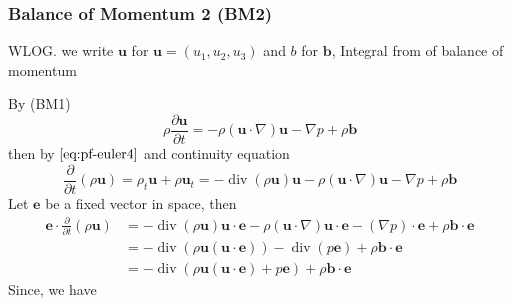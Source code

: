 \subsubsection{Balance of Momentum 2 (BM2)} %

WLOG. we write $\textbf{u}$ for $\textbf{u} = (u_1, u_2, u_3)$ and $b$ for $\textbf{b}$, Integral from of balance of momentum

By (BM1) 
\begin{equation}
\rho \frac{\partial \textbf{u}}{\partial t} = - \rho (\textbf{u}\cdot \nabla) \textbf{u} - \nabla p + \rho \textbf{b}\label{eq:pf-euler4}
\end{equation}
then by $\ref{eq:pf-euler4}$  and continuity equation
\begin{equation}
\frac{\partial}{\partial t} (\rho \textbf{u}) = \rho_{t} \textbf{u} + \rho \textbf{u}_t = -\operatorname{div}(\rho\textbf{u}) \textbf{u} - \rho (\textbf{u}\cdot \nabla )\textbf{u} - \nabla p + \rho \textbf{b}
\end{equation}
Let $\textbf{e}$ be a fixed vector in space, then
\begin{equation}
\begin{aligned}
\textbf{e} \cdot \frac{\partial }{\partial t} (\rho \textbf{u})
&= - \operatorname{div}(\rho\textbf{u}) \textbf{u} \cdot \textbf{e}
- \rho (\textbf{u}\cdot \nabla )\textbf{u}\cdot \textbf{e}
- (\nabla p)\cdot \textbf{e} + \rho \textbf{b}\cdot \textbf{e}\\
&= - \operatorname{div}\left(\rho \textbf{u}(\textbf{u}\cdot\textbf{e})\right)
- \operatorname{div}\left(p\textbf{e}\right)
+ \rho \textbf{b}\cdot\textbf{e}\\
&= - \operatorname{div}\left(\rho \textbf{u}(\textbf{u}\cdot\textbf{e}) + p\textbf{e}\right)
+ \rho \textbf{b}\cdot\textbf{e}
\end{aligned}\label{eq:pf-euler5}
\end{equation}
Since, we have 

